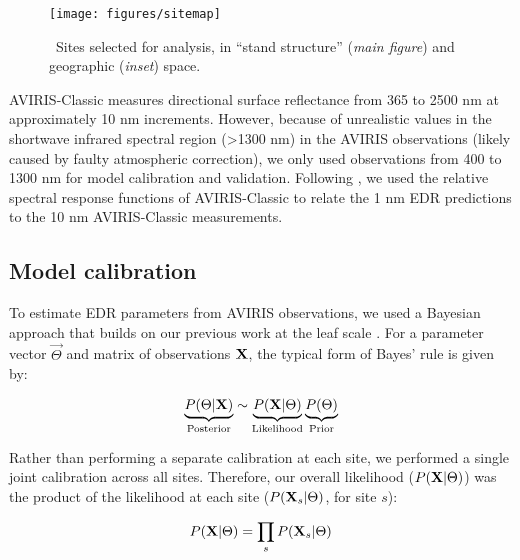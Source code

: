\begin{figure}
  \centering
  \texttt{[image: figures/sitemap]}
  \caption{\
    Sites selected for analysis, in ``stand structure'' (\textit{main figure}) and geographic (\textit{inset}) space.
  }\label{fig:sites}
\end{figure}

AVIRIS-Classic measures directional surface reflectance from 365 to 2500 \unit{nm} at approximately 10 \unit{nm} increments.
However, because of unrealistic values in the shortwave infrared spectral region (>1300 \unit{nm}) in the AVIRIS observations (likely caused by faulty atmospheric correction), we only used observations from 400 to 1300 \unit{nm} for model calibration and validation.
Following \citet{shiklomanov2016quantifying}, we used the relative spectral response functions of AVIRIS-Classic to relate the 1 \unit{nm} EDR predictions to the 10 \unit{nm} AVIRIS-Classic measurements.

\subsection{Model calibration}

To estimate EDR parameters from AVIRIS observations, we used a Bayesian approach that builds on our previous work at the leaf scale \citep{shiklomanov2016quantifying}.
For a parameter vector $\vec{\Theta}$ and matrix of observations $\mathbf{X}$, the typical form of Bayes' rule is given by:

\begin{equation}
  \underbrace{P(\relax{\Theta} | \mathbf{X})}_{\text{Posterior}} \sim \underbrace{P(\mathbf{X} | \relax{\Theta})}_{\text{Likelihood}} \underbrace{P(\relax{\Theta})}_{\text{Prior}}
\end{equation}

Rather than performing a separate calibration at each site, we performed a single joint calibration across all sites.
Therefore, our overall likelihood ($P(\mathbf{X} | \relax{\Theta})$) was the product of the likelihood at each site ($P(\mathbf{X}_{s} | \relax{\Theta})$, for site $s$):

\begin{equation}
  P(\mathbf{X} | \relax{\Theta}) = \prod_{s} P(\mathbf{X}_{s} | \relax{\Theta})
\end{equation}

